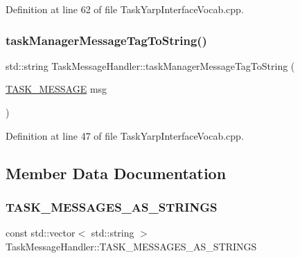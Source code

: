 Definition at line 62 of file Task\+Yarp\+Interface\+Vocab.\+cpp.

\hypertarget{classocra_1_1TaskMessageHandler_a2a0c5990fe24d82e0c58b6133857a4cd}{}\label{classocra_1_1TaskMessageHandler_a2a0c5990fe24d82e0c58b6133857a4cd} 
\subsubsection{\texorpdfstring{task\+Manager\+Message\+Tag\+To\+String()}{taskManagerMessageTagToString()}}
{\footnotesize\ttfamily std\+::string Task\+Message\+Handler\+::task\+Manager\+Message\+Tag\+To\+String (\begin{DoxyParamCaption}\item[{\hyperlink{namespaceocra_ae51761f3980546f5ee4cbc6ebe4216dd}{T\+A\+S\+K\+\_\+\+M\+E\+S\+S\+A\+GE}}]{msg }\end{DoxyParamCaption})\hspace{0.3cm}{\ttfamily [static]}}



Definition at line 47 of file Task\+Yarp\+Interface\+Vocab.\+cpp.



\subsection{Member Data Documentation}
\hypertarget{classocra_1_1TaskMessageHandler_a9afe80001080bc12286069365ab918ee}{}\label{classocra_1_1TaskMessageHandler_a9afe80001080bc12286069365ab918ee} 
\subsubsection{\texorpdfstring{T\+A\+S\+K\+\_\+\+M\+E\+S\+S\+A\+G\+E\+S\+\_\+\+A\+S\+\_\+\+S\+T\+R\+I\+N\+GS}{TASK\_MESSAGES\_AS\_STRINGS}}
{\footnotesize\ttfamily const std\+::vector$<$ std\+::string $>$ Task\+Message\+Handler\+::\+T\+A\+S\+K\+\_\+\+M\+E\+S\+S\+A\+G\+E\+S\+\_\+\+A\+S\+\_\+\+S\+T\+R\+I\+N\+GS\hspace{0.3cm}{\ttfamily [static]}}



